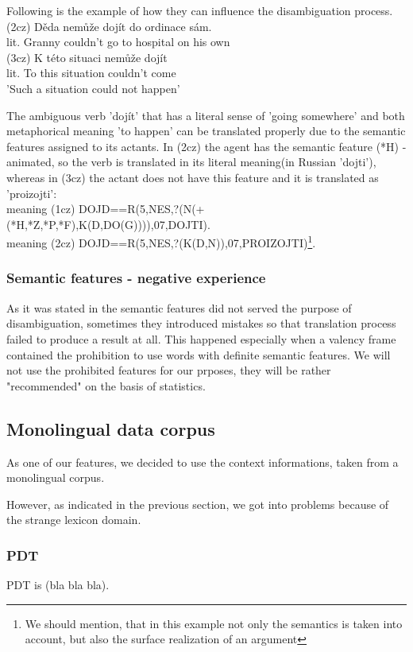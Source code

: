 \documentclass[letterpaper]{article}
\begin{document}
Following is the example of how they can influence the disambiguation process.\\
(2cz) Děda nemůže dojít do ordinace sám.\\
lit. Granny couldn't go to hospital on his own\\
(3cz) K této situaci nemůže dojít\\
lit. To this situation couldn't come\\
'Such a situation could not happen'

The ambiguous verb 'dojít' that has a literal sense of 'going somewhere'
and both metaphorical meaning 'to happen' can be translated properly
due to the semantic features assigned to its actants. In (2cz) the
agent has the semantic feature (*H) - animated, so the verb is translated
in its literal meaning(in Russian 'dojti'), whereas in (3cz) the actant does not have this feature
and it is translated as 'proizojti':\\
meaning (1cz) DOJD==R(5,NES,?(N(+(*H,*Z,*P,*F),K(D,DO(G)))),07,DOJTI).\\
meaning (2cz) DOJD==R(5,NES,?(K(D,N)),07,PROIZOJTI)\footnote{We should mention, that in this example
not only the semantics is taken into account, but also the surface realization of an argument}.\\


\subsubsection{Semantic features - negative experience}
As it was stated in \cite{KubonPHD2001} the semantic features did not
served the purpose of disambiguation, sometimes they introduced mistakes
so that translation process failed to produce a result at all. This
happened especially when a valency frame contained the prohibition
to use words with definite semantic features.
We will not use the prohibited features for our prposes, they will be rather "recommended" on the basis of
statistics.


\subsection{Monolingual data corpus}
As one of our features, we decided to use the context informations, taken from a monolingual corpus.

However, as indicated in the previous section, we got into problems because of the strange lexicon domain.
\subsubsection{PDT}
PDT is (bla bla bla).
\end{document}

